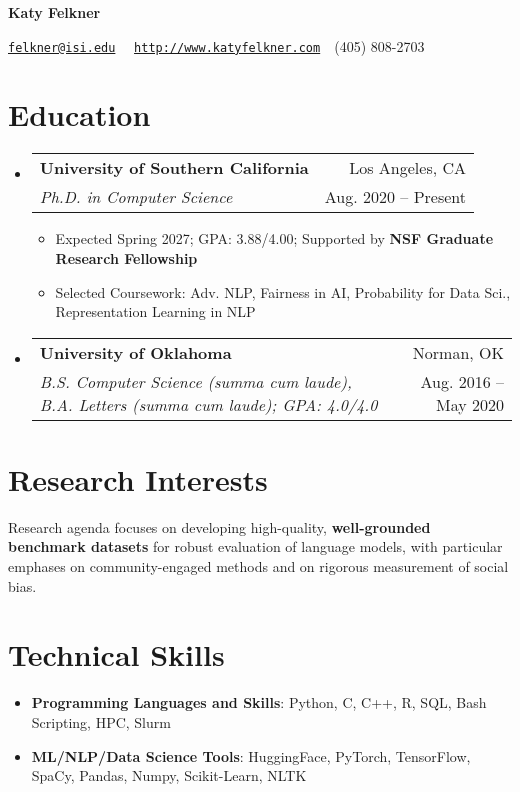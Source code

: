 \documentclass[letterpaper,11pt]{article}
\makeatletter
\newcommand{\resumeItemWithHeader}[2]{
  \item\small{
    \textbf{#1}{: #2 \vspace{-2pt}}
  }
}
\newcommand{\resumeItem}[1]{
  \item\small{
  {#1 \vspace{-2pt}}
  }
}
\newcommand{\resumeSubheading}[4]{
  \vspace{-1pt} \item
    \begin{tabular*}{0.97\textwidth}{l@{\extracolsep{\fill}}r}
      \textbf{#1} & #2 \\
      \textit{\small#3} & \small #4 \\
      
    \end{tabular*}\vspace{-5pt}
}
\newcommand{\resumeSubHeadingListStart}{\begin{itemize}[label={}, leftmargin=*]}
\newcommand{\resumeSubHeadingListEnd}{\end{itemize}}
\newcommand{\resumeItemListStart}{\begin{itemize}}
\newcommand{\resumeItemListEnd}{\end{itemize}\vspace{-5pt}}
\makeatother
\begin{document}
\textbf{\LARGE Katy Felkner}

\href{mailto:felkner@isi.edu}{\texttt{felkner@isi.edu}}~\textbar~ \href{http://katyfelkner.com/}{\texttt{http://www.katyfelkner.com}}~\textbar~(405) 808-2703


\section{Education}
  \resumeSubHeadingListStart
    \resumeSubheading
      {University of Southern California}{Los Angeles, CA}
      {Ph.D. in Computer Science}{Aug. 2020 -- Present}
      \resumeItemListStart
        \resumeItem{Expected Spring 2027; GPA: 3.88/4.00; Supported by \textbf{NSF Graduate Research Fellowship}}
      \resumeItem{Selected Coursework: Adv. NLP, Fairness in AI, Probability for Data Sci., Representation Learning in NLP}
      \resumeItemListEnd
      
    \resumeSubheading
      {University of Oklahoma}{Norman, OK}
      {B.S. Computer Science \textit{(summa cum laude)}, B.A. Letters \textit{(summa cum laude)}; GPA: 4.0/4.0}{Aug. 2016 -- May 2020}
  \resumeSubHeadingListEnd

\section{Research Interests}
\small{Research agenda focuses on developing high-quality, \textbf{well-grounded benchmark datasets} for robust evaluation of language models, with particular emphases on community-engaged methods and on rigorous measurement of social bias.}

\section{Technical Skills}
 \resumeSubHeadingListStart
   \resumeItemWithHeader{Programming Languages and Skills}{Python, C, C++, R, SQL, Bash Scripting, HPC, Slurm}
   \resumeItemWithHeader{ML/NLP/Data Science Tools}{HuggingFace, PyTorch, TensorFlow, SpaCy, Pandas, Numpy, Scikit-Learn, NLTK}
 \resumeSubHeadingListEnd
\end{document}
